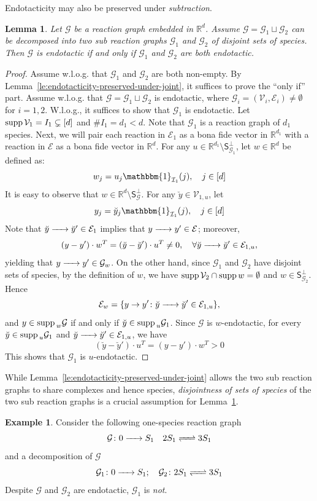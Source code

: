 \documentclass[10pt]{amsart}
\numberwithin{equation}{section}
\theoremstyle{plain}
\newtheorem{lemma}[theorem]{Lemma}
\theoremstyle{definition}
\newtheorem{example}[theorem]{Example}
\theoremstyle{remark}
\newcommand{\cE}{\mathcal{E}}
\newcommand{\cG}{\mathcal{G}}
\newcommand{\cI}{I}
\newcommand{\cV}{\mathcal{V}}
\newcommand{\supp}{{\rm supp\,}}
\begin{document}
Endotacticity may also be preserved under \emph{subtraction}.
\begin{lemma}\label{le:endotacticity-preserved-under-subtraction}
Let $\cG$ be a reaction graph  embedded in $\mathbb{R}^d$. Assume $\cG=\cG_1\sqcup\cG_2$ can be  decomposed into two sub reaction graphs $\cG_1$ and $\cG_2$ of disjoint sets of species. Then $\cG$ is endotactic if and only if $\cG_1$ and $\cG_2$ are both endotactic.
\end{lemma}
\begin{proof}
Assume w.l.o.g. that $\cG_1$ and $\cG_2$ are both non-empty. By Lemma~\ref{le:endotacticity-preserved-under-joint}, it suffices to prove the ``only if'' part. Assume w.l.o.g. that $\cG=\cG_1\sqcup\cG_2$ is endotactic, where $\cG_i=(\cV_i,\cE_i)\neq\emptyset$ for $i=1,2$. W.l.o.g., it suffices to show that $\cG_1$ is endotactic.  Let $\supp \cV_1=\cI_1\subsetneq[d]$ and $\#\cI_1=d_1<d$. Note that $\cG_1$ is a reaction graph of $d_1$ species. 
Next, we will pair each reaction in $\cE_1$ as a bona fide vector in $\mathbb{R}^{d_1}$ with a reaction in $\cE$ as a bona fide vector in $\mathbb{R}^d$. For any $u\in\mathbb{R}^{d_1}\setminus\mathsf{S}^{\perp}_{\cG_1}$, let $w\in\mathbb{R}^d$ be defined as:
 \[w_j=u_j\mathbbm{1}_{\mathcal{I}_1}(j),\quad j\in[d]\] It is easy to observe that $w\in\mathbb{R}^d\setminus\mathsf{S}^{\perp}_{\cG}$. 
 For any $\breve{y}\in\cV_{1,u}$, let $$y_j=\breve{y}_j\mathbbm{1}_{\mathcal{I}_1}(j),\quad j\in[d]$$
Note that $\breve{y}\ce{->}\breve{y}'\in\cE_1$ implies that $y\ce{->}y'\in\cE$; moreover, $$(y-y')\cdot w^T=(\breve{y}-\breve{y}')\cdot u^T\neq0,\quad \forall \breve{y}\ce{->}\breve{y}'\in\cE_{1,u},$$ yielding that $y\ce{->[]} y'\in\cG_w$.  On the other hand, since $\cG_1$ and $\cG_2$ have disjoint sets of species, by the definition of $w$, we have $\supp\cV_2\cap\supp w=\emptyset$ and  $w\in\mathsf{S}_{\cG_2}^{\perp}$. Hence $$\cE_w=\{y\to y'\colon \breve{y}\ce{->[]} \breve{y}'\in\cE_{1,u}\},$$ and 
$y\in\supp_w\cG$ if and only if $\breve{y}\in\supp_u\cG_1$. Since $\cG$ is $w$-endotactic,  for every 
$\breve{y}\in\supp_u\cG_1$ and $\breve{y}\ce{->}\breve{y}'\in\cE_{1,u}$, we have$$(\breve{y}-\breve{y}')\cdot u^T=(y-y')\cdot w^T>0$$ This shows that $\cG_1$ is $u$-endotactic.
\end{proof}

While Lemma~\ref{le:endotacticity-preserved-under-joint} allows the two sub reaction graphs to share complexes and hence species, \emph{disjointness of sets of species}
of the two sub reaction graphs is a crucial assumption for Lemma~\ref{le:endotacticity-preserved-under-subtraction}.
\begin{example}
Consider the following one-species reaction graph $$\cG\colon 0\ce{->[]} S_1\quad 2S_1\ce{<=>[]}3S_1$$
and a decomposition of 
 $\cG$ $$\cG_1\colon 0\ce{->[]} S_1;\quad \cG_2\colon2S_1\ce{<=>[]}3S_1$$ Despite $\cG$ and $\cG_2$ are endotactic, $\cG_1$ is \emph{not}.
\end{example}
\end{document}
